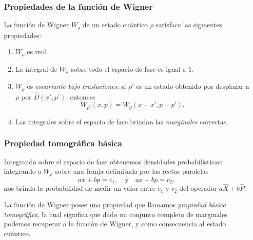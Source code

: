 \documentclass[10pt, spanish]{beamer}
\begin{document}
  \begin{frame}
    \frametitle{Propiedades de la función de Wigner}

    La función de Wigner $W_\rho$ de un estado cuántico
    $\rho$ satisface las siguientes propiedades:

    \vspace{5pt}

    \begin{enumerate}
      \item $W_\rho$ es real.
      \item La integral de $W_\rho$ sobre todo el espacio de
        fase es igual a $1$.
      \item $W_\rho$ es \textit{covariante bajo
        traslaciones}: si $\rho'$ es un estado obtenido por
        desplazar a $\rho$ por $\hat D(x',p')$, entonces
        \begin{equation}
          W_{\rho'}(x,p)
          = W_\rho(x-x',p-p').
        \end{equation}
      \item Las integrales sobre el espacio de fase brindan
        las \textit{marginales} correctas.
    \end{enumerate}
  \end{frame}

  \begin{frame}
    \frametitle{Propiedad tomográfica básica}

    Integrando sobre el espacio de fase obtenemos densidades
    probabilísticas: integrando a $W_\rho$ sobre una franja
    delimitada por las rectas paralelas
    \[
      ax+bp=c_1,
      \quad \text{y} \quad ax+bp=c_2,
    \]
    nos brinda la probabilidad de medir un
    valor entre $c_1$  y $c_2$ del operador $a \hat X + b
    \hat P$.

    \vspace{15pt}

    \pause

    La función de Wigner posee una propiedad que llamamos
    \textit{propiedad básica tomográfica}, la cual significa
    que dado un conjunto completo de marginales podemos
    recuperar a la función de Wigner, y como consecuencia al
    estado cuántico.



  \end{frame}
\end{document}
